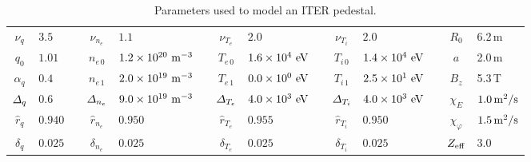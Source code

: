 \documentclass[12pt,prb,aps]{revtex4-1}
\begin{document}
\begin{table}\centering
\begin{tabular}{|cl | cl | cl | cl | cl |}
$\nu_q$              &  $3.5$     & $\nu_{n_e}$               & $1.1$                                               & $\nu_{T_e}$             &  $2.0$                                        & $\nu_{T_i}$             &    $2.0$                                    & $R_0$ & 6.2\,m \\[0.5ex]
$q_0$                 & $1.01$    & $n_{e\,0}$                  & $1.2\times 10^{20}\,\,{\rm m}^{-3}$~~  & $T_{e\,0}$                &  $1.6\times 10^{4}\,\,{\rm eV}$ & $T_{i\,0}$                &  $1.4\times 10^{4}\,\,{\rm eV}$  & $a$ & 2.0\,m\\[0.5ex]
$\alpha_q$         & $0.4$      & $n_{e\,1}$                  & $2.0\times 10^{19}\,\,{\rm m}^{-3}$  & $T_{e\,1}$                &  $0.0\times 10^{0}\,\,{\rm eV}$ & $T_{i\,1}$                &  $2.5\times 10^{1}\,\,{\rm eV}$~~  &$B_z$ & 5.3\,T \\[0.5ex]
${\mit\Delta}_q$ & $0.6$      &  ${\mit\Delta}_{n_e}$  & $9.0\times 10^{19}\,\,{\rm m}^{-3}$  & ${\mit\Delta}_{T_e}$ &  $4.0\times 10^{3}\,\,{\rm eV}$~~ & ${\mit\Delta}_{T_i}$ &  $4.0\times 10^{3}\,\,{\rm eV}$\ & $\chi_E$ & $1.0\,{\rm m^2/s}$\\[0.5ex]
$\hat{r}_q$         & $0.940$~~   & $\hat{r}_{n_e}$           & $0.950$                                            & $\hat{r}_{T_e}$         &  $0.955$                                 & $\hat{r}_{T_i}$         &  $0.950$                                    & $\chi_\varphi$ &$1.5\,{\rm m^2/s}$ \\[0.5ex]
$\delta_q$          & $0.025$  & $\delta_{n_e}$            & $0.025$                                            & $\delta_{T_e}$          &  $0.025$                                   & $\delta_{T_i}$         & $0.025$                                     & $Z_{\rm eff}$ & 3.0 \\[0.5ex]
\end{tabular}
\caption{Parameters used to model an ITER pedestal.}\label{t2}
\end{table}
\end{document}
